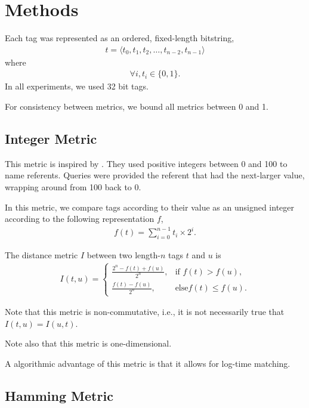 \section{Methods}

Each tag was represented as an ordered, fixed-length bitstring,
\begin{align*}
t = \langle t_0, t_1, t_2, \dots, t_{n-2}, t_{n-1} \rangle
\end{align*}
where
\begin{align*}
\forall i, t_i \in \{0, 1\}.
\end{align*}
In all experiments, we used 32 bit tags.

For consistency between metrics, we bound all metrics between 0 and 1.

\subsection{Integer Metric}

This metric is inspired by \citep{spector2011tag}.
They used positive integers between 0 and 100 to name referents.
Queries were provided the referent that had the next-larger value, wrapping around from 100 back to 0.

In this metric, we compare tags according to their value as an unsigned integer according to the following representation $f$,
\begin{align*}
f(t)
= \sum_{i=0}^{n-1} t_i \times 2^i.
\end{align*}

The distance metric $I$ between two length-$n$ tags $t$ and $u$ is
\begin{align*}
I(t, u) =
\begin{cases}
  \frac{2^n - f(t) + f(u)}{2^n}, & \text{if } f(t) > f(u), \\
  \frac{f(t) - f(u)}{2^n},         & \text{else} f(t) \leq f(u).
\end{cases}
\end{align*}

Note that this metric is non-commutative, i.e., it is not necessarily true that $I(t, u) = I(u, t)$.

Note also that this metric is one-dimensional.

A algorithmic advantage of this metric is that it allows for log-time matching.

\subsection{Hamming Metric}

